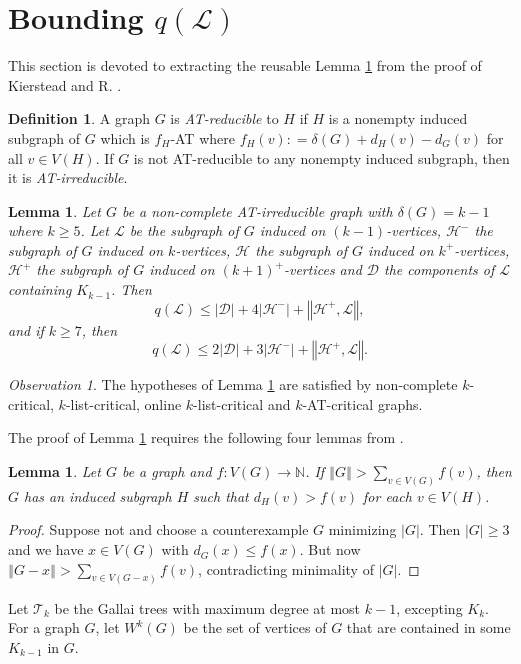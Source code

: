 \documentclass[10pt]{article}
\theoremstyle{plain}
\newtheorem{lem}[thm]{Lemma}
\theoremstyle{definition}
\newtheorem{defn}{Definition}
\theoremstyle{remark}
\newtheorem*{observation}{Observation}
\newcommand{\fancy}[1]{\mathcal{#1}}
\newcommand{\IN}{\mathbb{N}}
\newcommand{\D}{\fancy{D}}
\newcommand{\T}{\fancy{T}}
\renewcommand{\L}{\fancy{L}}
\newcommand{\HH}{\fancy{H}}
\newcommand{\card}[1]{\left|#1\right|}
\newcommand{\size}[1]{\left\Vert#1\right\Vert}
\newcommand{\func}[3]{#1\colon #2 \rightarrow #3}
\newcommand{\DefinedAs}{\mathrel{\mathop:}=}
\def\D{\fancy{D}}
\begin{document}
\section{Bounding $q(\L)$}
This section is devoted to extracting the reusable Lemma \ref{qLemma} from the proof of Kierstead and R. \cite{OreVizing}.

\begin{defn}
	A graph $G$ is \emph{AT-reducible} to $H$ if $H$ is a nonempty induced subgraph of $G$ which is $f_H$-AT where $f_H(v) \DefinedAs \delta(G) + d_H(v) - d_G(v)$ for all $v \in V(H)$.  
	If $G$ is not AT-reducible to any nonempty induced subgraph, then it is \emph{AT-irreducible}.
\end{defn}

\begin{lem}\label{qLemma}
	Let $G$ be a non-complete AT-irreducible graph with $\delta(G) = k-1$ where $k \ge 5$.  Let $\L$ be the subgraph of $G$ induced on $(k-1)$-vertices, $\HH^-$ the subgraph of $G$ induced on $k$-vertices, 
	$\HH$ the subgraph of $G$ induced on $k^+$-vertices, $\HH^+$ the subgraph of $G$ induced on $(k+1)^+$-vertices and $\D$ the components of $\L$ containing $K_{k-1}$.  Then
	\[q(\L) \le \card{\D} + 4\card{\HH^-} + \size{\HH^+, \L},\] and if $k \ge 7$, then
	\[q(\L) \le 2\card{\D} + 3\card{\HH^-} + \size{\HH^+, \L}.\]
\end{lem}

\begin{observation}
The hypotheses of Lemma \ref{qLemma} are satisfied by non-complete $k$-critical, $k$-list-critical, online $k$-list-critical and $k$-AT-critical graphs.
\end{observation}

The proof of Lemma \ref{qLemma} requires the following four lemmas from \cite{OreVizing}.

\begin{lem}\label{DegenerateEuler}
Let $G$ be a graph and $\func{f}{V(G)}{\IN}$.  If $\size{G} > \sum_{v \in V(G)} f(v)$, then $G$ has an induced subgraph $H$ such that $d_H(v) > f(v)$ for each $v \in V(H)$.
\end{lem}
\begin{proof}
Suppose not and choose a counterexample $G$ minimizing $\card{G}$. Then $\card{G} \ge 3$ and we have $x \in V(G)$ with $d_G(x) \leq f(x)$. But now $\size{G-x} > \sum_{v \in V(G-x)} f(v)$, contradicting minimality of $\card{G}$.
\end{proof}

Let $\T_k$ be the Gallai trees with maximum degree at most $k-1$, excepting $K_k$. For a graph $G$, let $W^k(G)$ be the set of vertices of $G$ that are contained in some $K_{k-1}$ in $G$.  
\end{document}
